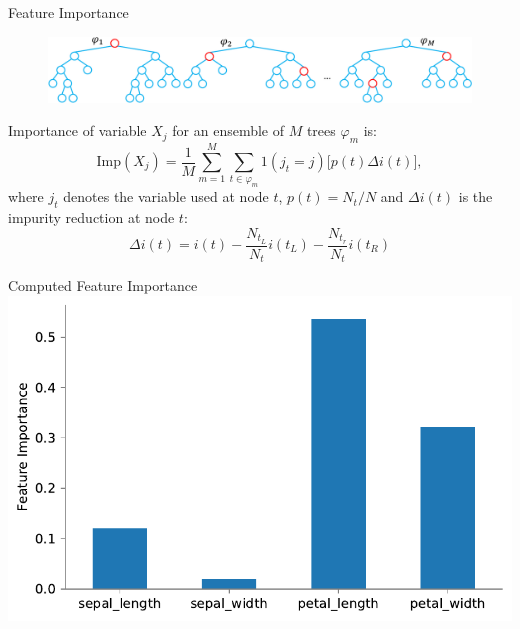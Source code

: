 \documentclass{beamer}
\begin{document}
\begin{frame}{Feature Importance\footnotemark}
  \begin{figure}
    \includegraphics[scale=0.4]{mdi.pdf}
  \end{figure}
  Importance of variable $X_j$ for an ensemble of $M$ trees $\varphi_{m}$ is:
  \begin{equation*}
    \text{Imp}(X_j) = \frac{1}{M} \sum_{m=1}^M \sum_{t \in \varphi_{m}} 1(j_t = j) \Big[ p(t) \Delta i(t) \Big],
  \end{equation*}
  where $j_t$ denotes the variable used at node $t$, $p(t)=N_t/N$ and $\Delta i(t)$ is the impurity reduction at node $t$:
  \begin{equation*}
    \Delta i(t) = i(t) - \frac{N_{t_L}}{N_t} i(t_L) - \frac{N_{t_r}}{N_t} i(t_R)
  \end{equation*}

\end{frame}


\begin{frame}{Computed Feature Importance}
  \includegraphics[scale=0.6]{feature-importance.pdf}
\end{frame}
\end{document}
